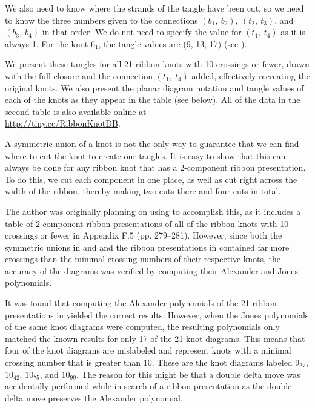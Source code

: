 \begin{paper}
We also need to know where the strands of the tangle have been cut, so we need
to know the three numbers given to the connections $(b_1,~b_2),~(t_2,~t_3)$, and
$(b_3,~b_4)$ in that order.
We do not need to specify the value for $(t_1,~t_4)$ as it is always 1.
For the knot $6_1$, the tangle values are (9, 13, 17) (see \figExample).

We present these tangles for all 21 ribbon knots with 10 crossings or fewer,
drawn with the full closure and the connection $(t_1,~t_4)$ added, effectively
recreating the original knots.
We also present the planar diagram notation and tangle values of each of the
knots as they appear in the table (see below).
All of the data in the second table is also available online at\\
\url{http://tiny.cc/RibbonKnotDB}.


A symmetric union of a knot is not the only way to guarantee that we can find
where to cut the knot to create our tangles.
It is easy to show that this can always be done for any ribbon knot that has a
2-component ribbon presentation.
To do this, we cut each component in one place, as well as cut right across the
width of the ribbon, thereby making two cuts there and four cuts in total.

The author was originally planning on using \cite{knots} to accomplish this, as
it includes a table of 2-component ribbon presentations of all of the ribbon
knots with 10 crossings or fewer in Appendix F.5 (pp. 279--281).
However, since both the symmetric unions in \cite{one} and \cite{many} and the
ribbon presentations in \cite{knots} contained far more crossings than the
minimal crossing numbers of their respective knots, the accuracy of the diagrams
was verified by computing their Alexander and Jones polynomials.

It was found that computing the Alexander polynomials of the 21 ribbon
presentations in \cite{knots} yielded the correct results.
However, when the Jones polynomials of the same knot diagrams were computed,
the resulting polynomials only matched the known results for only 17 of the 21
knot diagrams.
This means that four of the knot diagrams are mislabeled and represent knots
with a minimal crossing number that is greater than 10.
These are the knot diagrams labeled $9_{27}$, $10_{42}$, $10_{75}$, and
$10_{99}$.
The reason for this might be that a double delta move was accidentally performed
while in search of a ribbon presentation as the double delta move preserves the
Alexander polynomial.


\end{paper}
